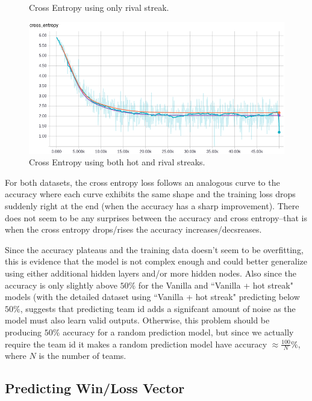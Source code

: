 \documentclass{article} %
\begin{document}
\begin{figure}[!htb]
  \caption{Cross Entropy using only rival streak.}\label{fig:wteam-onehot-r-crossentropy}
\endminipage
{}%
  \includegraphics[width=\linewidth]{plots/model1/wteam_onehot/streak-hr/crossentropy.png}
  \caption{Cross Entropy using both hot and rival streaks.}\label{fig:wteam-onehot-hr-crossentropy}
\endminipage
\end{figure}
For both datasets, the cross entropy loss follows an analogous curve to the accuracy where each curve exhibits the same shape and the training loss drops suddenly right at the end (when the accuracy has a sharp improvement).  There does not seem to be any surprises between the accuracy and cross entropy--that is when the cross entropy drops/rises the accuracy increases/decsreases.


Since the accuracy plateaus and the training data doesn't seem to be overfitting, this is evidence that the model is not complex enough and could better generalize using either additional hidden layers and/or more hidden nodes.
Also since the accuracy is only slightly above $50\%$ for the Vanilla and ``Vanilla + hot streak" models (with the detailed dataset using ``Vanilla + hot streak" predicting below $50\%$, suggests that predicting team id adds a signifcant amount of noise as the model must also learn valid outputs.  Otherwise, this problem should be producing $50\%$ accuracy for a random prediction model, but since we actually require the team id it makes a random prediction model have accuracy $\approx \frac{100}{N}\%$, where $N$ is the number of teams.



\subsection{Predicting Win/Loss Vector}
\label{sec:results-winloss-vector}
\end{document}

